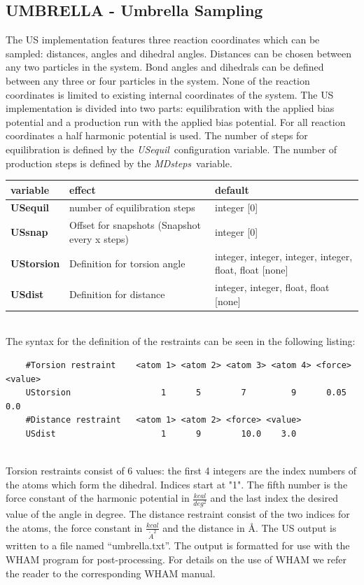 \documentclass[10pt,a4paper]{article} %
\begin{document}
	\subsection{UMBRELLA - Umbrella Sampling}
	The \acf{US}\supercite{umbrellasampling1, umbrellasampling2, umbrellasamplingreview} implementation features three reaction coordinates which can be sampled: distances, angles and dihedral angles. Distances can be chosen between any two particles in the system. Bond angles and dihedrals can be defined between any three or four particles in the system. None of the reaction coordinates is limited to existing internal coordinates of the system.
	The \acl{US} implementation is divided into two parts: equilibration with the applied bias potential and a production run with the applied bias potential. For all reaction coordinates a half harmonic potential is used. The number of steps for equilibration is defined by the \glqq\textit{USequil}\grqq~configuration variable. The number of production steps is defined by the \glqq\textit{MDsteps}\grqq~variable.

	\begin{tabularx}{\textwidth}{l|X|X}
		variable & effect & default \\
		\hline
		\textbf{USequil} & number of equilibration steps & integer [0] \\
		\textbf{USsnap} & Offset for snapshots (Snapshot every x steps) & integer [0]  \\
		\textbf{UStorsion} & Definition for torsion angle & integer, integer, integer, integer, float, float [none] \\
		\textbf{USdist} & Definition for distance & integer, integer, float, float [none] \\
	\end{tabularx}~\\

	The syntax for the definition of the restraints can be seen in the following listing:\\

	\begin{lstlisting}
	#Torsion restraint    <atom 1> <atom 2> <atom 3> <atom 4> <force> <value>
	UStorsion                  1      5        7         9      0.05    0.0
	#Distance restraint   <atom 1> <atom 2> <force> <value>
	USdist                     1      9        10.0    3.0
	\end{lstlisting}
	~\\
	Torsion restraints consist of 6 values: the first 4 integers are the index numbers of the atoms which form the dihedral. Indices start at "1". The fifth number is the force constant of the harmonic potential in $\frac{kcal}{deg^2}$ and the last index the desired value of the angle in degree.
	The distance restraint consist of the two indices for the atoms, the force constant in $\frac{kcal}{{\mathring{A}}^2}$ and the distance in \AA.
	The \acl{US} output is written to a file named ``umbrella.txt''. The output is formatted for use with the \ac{WHAM} program\supercite{wham1, wham2} for post-processing. For details on the use of WHAM we refer the reader to the corresponding \ac{WHAM} manual.
\end{document}
